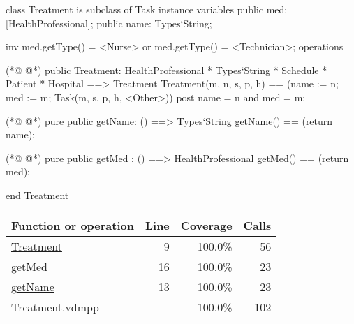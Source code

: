 \begin{vdmpp}[breaklines=true]
class Treatment is subclass of Task
instance variables
  public med: [HealthProfessional];
  public name: Types`String;
  
  inv med.getType() = <Nurse> or med.getType() = <Technician>;
operations

(*@
\label{Treatment:9}
@*)
 public Treatment: HealthProfessional * Types`String * Schedule * Patient * Hospital ==> Treatment
  Treatment(m, n, s, p, h) == (name := n; med := m; Task(m, s, p, h, <Other>))
 post name = n and med = m;
 
(*@
\label{getName:13}
@*)
 pure public getName: () ==> Types`String
  getName() == (return name);
 
(*@
\label{getMed:16}
@*)
 pure public getMed : () ==> HealthProfessional
  getMed() == (return med);

end Treatment
\end{vdmpp}
\bigskip
\begin{longtable}{|l|r|r|r|}
\hline
Function or operation & Line & Coverage & Calls \\
\hline
\hline
\hyperref[Treatment:9]{Treatment} & 9&100.0\% & 56 \\
\hline
\hyperref[getMed:16]{getMed} & 16&100.0\% & 23 \\
\hline
\hyperref[getName:13]{getName} & 13&100.0\% & 23 \\
\hline
\hline
Treatment.vdmpp & & 100.0\% & 102 \\
\hline
\end{longtable}

